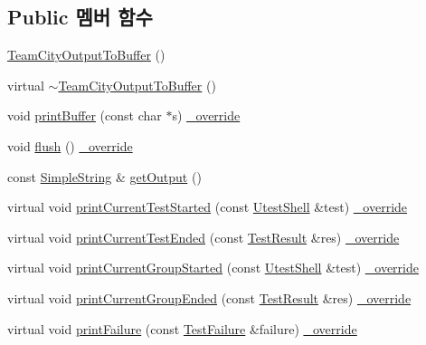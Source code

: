 \subsection*{Public 멤버 함수}
\begin{DoxyCompactItemize}
\item 
\hyperlink{class_team_city_output_to_buffer_a0634226a99948bea210f07eea37ce029}{Team\+City\+Output\+To\+Buffer} ()
\item 
virtual \hyperlink{class_team_city_output_to_buffer_aa3e6a0e5ba957ce5e5e43670d2e3460c}{$\sim$\+Team\+City\+Output\+To\+Buffer} ()
\item 
void \hyperlink{class_team_city_output_to_buffer_a8b83bd531b9e38a5dd9c61e14bf1636c}{print\+Buffer} (const char $\ast$s) \hyperlink{_cpp_u_test_config_8h_a049bea15dd750e15869863c94c1efc3b}{\+\_\+override}
\item 
void \hyperlink{class_team_city_output_to_buffer_a9fde218af86a81b79f82b86f3ddeabe5}{flush} () \hyperlink{_cpp_u_test_config_8h_a049bea15dd750e15869863c94c1efc3b}{\+\_\+override}
\item 
const \hyperlink{class_simple_string}{Simple\+String} \& \hyperlink{class_team_city_output_to_buffer_a17a31248a362b3190d2b195ba2a9616f}{get\+Output} ()
\item 
virtual void \hyperlink{class_team_city_test_output_a5b7509d804ba2fb3be690077ae93345a}{print\+Current\+Test\+Started} (const \hyperlink{class_utest_shell}{Utest\+Shell} \&test) \hyperlink{_cpp_u_test_config_8h_a049bea15dd750e15869863c94c1efc3b}{\+\_\+override}
\item 
virtual void \hyperlink{class_team_city_test_output_a03ceb1aab29f845f5d0a6e5bb4124885}{print\+Current\+Test\+Ended} (const \hyperlink{class_test_result}{Test\+Result} \&res) \hyperlink{_cpp_u_test_config_8h_a049bea15dd750e15869863c94c1efc3b}{\+\_\+override}
\item 
virtual void \hyperlink{class_team_city_test_output_a0478e2d3cabe1da8114c90f0ae7e7227}{print\+Current\+Group\+Started} (const \hyperlink{class_utest_shell}{Utest\+Shell} \&test) \hyperlink{_cpp_u_test_config_8h_a049bea15dd750e15869863c94c1efc3b}{\+\_\+override}
\item 
virtual void \hyperlink{class_team_city_test_output_a19ba7b19942e492a0eab6ac4d3d90286}{print\+Current\+Group\+Ended} (const \hyperlink{class_test_result}{Test\+Result} \&res) \hyperlink{_cpp_u_test_config_8h_a049bea15dd750e15869863c94c1efc3b}{\+\_\+override}
\item 
virtual void \hyperlink{class_team_city_test_output_a5c917b949750083f7774dbcf412cfbc5}{print\+Failure} (const \hyperlink{class_test_failure}{Test\+Failure} \&failure) \hyperlink{_cpp_u_test_config_8h_a049bea15dd750e15869863c94c1efc3b}{\+\_\+override}

\end{DoxyCompactItemize}
